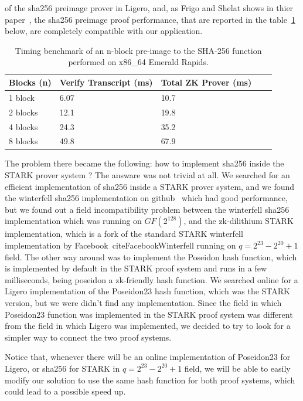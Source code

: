 \documentclass{article}
\begin{document}
of the sha256 preimage prover in Ligero, and, as Frigo and Shelat shows in thier paper~\cite{cryptoeprint:2024/2010}, the sha256 preimage
proof performance, that are reported in the table~\ref{tab:sha256_frigo_shelat} below, are completely compatible with our application.
\begin{table}[ht]
\centering
\caption{Timing benchmark of an n-block pre-image to the SHA-256 function performed on x86\_64 Emerald Rapids.}
\label{tab:sha256_frigo_shelat}
\small
\begin{tabularx}{\textwidth}{@{}l X X X X@{}}
\toprule
\textbf{Blocks (n)} & \textbf{Verify Transcript (ms)} & \textbf{Total ZK Prover (ms)} \\
\midrule
1 block  & 6.07  & 10.7 \\
2 blocks & 12.1  & 19.8 \\
4 blocks & 24.3  & 35.2 \\
8 blocks & 49.8  & 67.9 \\
\bottomrule
\end{tabularx}
\end{table}
The problem there became the following: how to implement sha256 inside the STARK prover system ? The answare was not trivial at all.
We searched for an efficient implementation of sha256 inside a STARK prover system, and we found the winterfell sha256 implementation
on github~\cite{iStrannikWinterfellSha256} which had good performance, but we found out a field incompatibility problem between the
winterfell sha256 implementation which was running on $GF(2^{128})$, and the zk-dilithium STARK implementation, which is a fork of 
the standard STARK winterfell implementation by Facebook~cite{FacebookWinterfell} running on $q = 2^{23} - 2^{20} + 1$ field.
The other way around was to implement the Poseidon hash function, which is implemented by default in the STARK proof system 
and runs in a few milliseconds, being poseidon a zk-friendly hash function. We searched online for a Ligero implementation of
the Poseidon23 hash function, which was the STARK version, but we were didn't find any implementation. Since the field in which
Poseidon23 function was implemented in the STARK proof system was different from the field in which Ligero was implemented, 
we decided to try to look for a simpler way to connect the two proof systems.

Notice that, whenever there will be an online implementation of Poseidon23 for Ligero, or sha256 for STARK in 
$q = 2^{23} - 2^{20} + 1$ field, we will be able to easily modify our solution to use the same hash function for both proof 
systems, which could lead to a possible speed up.
\end{document}
